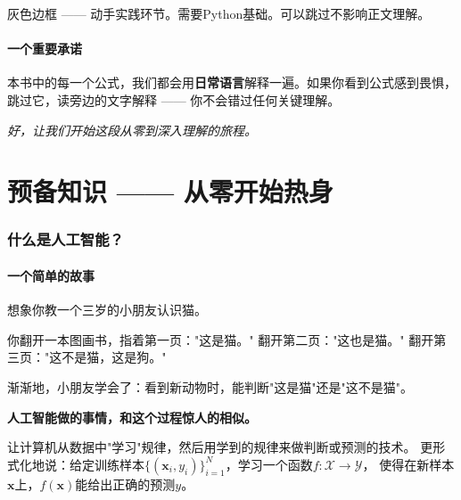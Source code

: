 \documentclass[11pt,a4paper]{ctexart}
\begin{document}
\begin{codebox}[编程实验]
灰色边框 —— 动手实践环节。需要Python基础。可以跳过不影响正文理解。
\end{codebox}

\subsection*{一个重要承诺}

本书中的每一个公式，我们都会用\textbf{日常语言}解释一遍。如果你看到公式感到畏惧，
跳过它，读旁边的文字解释 —— 你不会错过任何关键理解。

\vspace{6pt}
\begin{center}
\textit{好，让我们开始这段从零到深入理解的旅程。}
\end{center}

\newpage
\tableofcontents
\newpage

\part{预备知识 —— 从零开始热身}\vspace{18pt}

\section{什么是人工智能？}

\subsection{一个简单的故事}

想象你教一个三岁的小朋友认识猫。

你翻开一本图画书，指着第一页："这是猫。" 翻开第二页："这也是猫。"
翻开第三页："这不是猫，这是狗。"

渐渐地，小朋友学会了：看到新动物时，能判断"这是猫"还是"这不是猫"。

\textbf{人工智能做的事情，和这个过程惊人的相似。}

\begin{defbox}
让计算机从数据中"学习"规律，然后用学到的规律来做判断或预测的技术。
更形式化地说：给定训练样本$\{(\mathbf{x}_i, y_i)\}_{i=1}^N$，学习一个函数$f: \mathcal{X} \to \mathcal{Y}$，
使得在新样本$\mathbf{x}$上，$f(\mathbf{x})$能给出正确的预测$y$。
\end{defbox}
\end{document}
